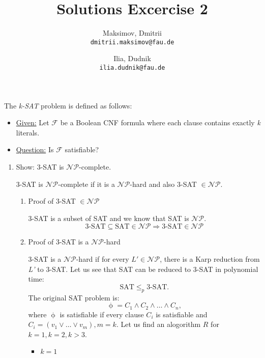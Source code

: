 \documentclass{homework}
\title{Solutions Excercise 2}
\author{
  Maksimov, Dmitrii\\
  \texttt{dmitrii.maksimov@fau.de}
  \and
  Ilia, Dudnik\\
  \texttt{ilia.dudnik@fau.de}
}
\begin{document}
\maketitle

\exercise
The \emph{k-SAT} problem is defined as follows:
\begin{itemize}
\item \underline{Given:} Let $\mathcal{F}$ be a Boolean CNF formula where each clause contains exactly \emph{k} literals.
\item \underline{Question:} Is $\mathcal{F}$ satisfiable?
\end{itemize}
\begin{enumerate}[label=(\alph*)]
	\item Show: 3-SAT is $\mathcal{NP}$-complete.
	
	3-SAT is $\mathcal{NP}$-complete if it is a $\mathcal{NP}$-hard and also 3-SAT $\in \mathcal{NP}$.
	\begin{enumerate}[label = \arabic*.]
		\item Proof of 3-SAT $\in \mathcal{NP}$

		3-SAT is a subset of SAT and we know that SAT is $\mathcal{NP}$.
		\[\text{3-SAT} \subseteq \text{SAT} \in \mathcal{NP} \Rightarrow \text{3-SAT} \in \mathcal{NP}\]
		\item Proof of 3-SAT is a $\mathcal{NP}$-hard
		
		3-SAT is a $\mathcal{NP}$-hard if for every $L'\in \mathcal{NP}$, there is a Karp reduction from \emph{L'} to 3-SAT. Let us see that SAT can be reduced to 3-SAT in polynomial time: \[\text{SAT}\leq_p \text{3-SAT}.\]
		The original SAT problem is: \[\upphi = C_1\land C_2\land \dots \land C_n, \] where $\upphi$ is satisfiable if every clause $C_i$ is satisfiable and $C_i=(v_1\lor \dots \lor v_m), m = k$. Let us find an alogorithm $R$ for $k=1, k=2, k>3$.
	\begin{itemize}
		\item $k=1$


\end{itemize}
\end{enumerate}
\end{enumerate}
\end{document}
